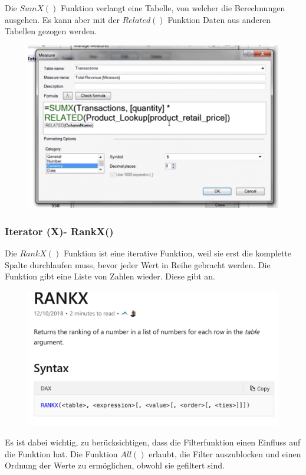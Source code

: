 Die $SumX()$ Funktion verlangt eine Tabelle, von welcher die Berechnungen ausgehen. Es kann aber mit der $Related()$ Funktion Daten aus anderen Tabellen gezogen werden. 

\begin{figure}[H]
	\centering
	\includegraphics[scale = 0.3]{attachment/chapter_1/screenshot108}
	\caption{}
	\label{fig:screenshot108}
\end{figure} 

\subsubsection{Iterator (X)- RankX()}
Die $RankX()$ Funktion ist eine iterative Funktion, weil sie erst die komplette Spalte durchlaufen muss, bevor jeder Wert in Reihe gebracht werden. 
Die Funktion gibt eine Liste von Zahlen wieder. Diese gibt an. 

\begin{figure}[H]
	\centering
	\includegraphics[scale = 0.3]{attachment/chapter_1/screenshot111}
	\caption{}
	\label{fig:screenshot111}
\end{figure} 
Es ist dabei wichtig, zu berücksichtigen, dass die Filterfunktion einen Einfluss auf die Funktion hat. Die Funktion $All()$ erlaubt, die Filter auszublocken und einen Ordnung der Werte zu ermöglichen, obwohl sie gefiltert sind.

